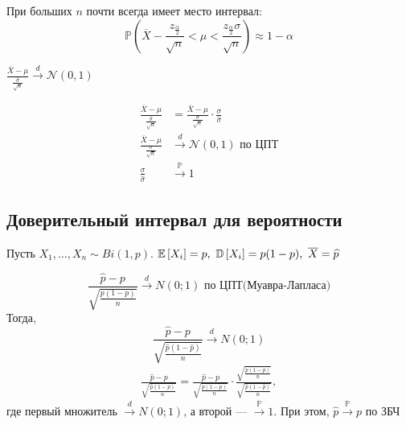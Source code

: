 \documentclass[a4paper, 10pt]{article}
\begin{document}
\comment При больших $n$ почти всегда имеет место интервал:
\begin{equation*}
    \mathbb{P}\left(\overline{X}-\frac{z_{\frac{\alpha}{2}}}{\sqrt{n}}<\mu<\frac{z_{\frac{\alpha}{2}} \sigma}{\sqrt{n}}\right)\approx1-\alpha
\end{equation*}

\theorem $\frac{\bar{X}-\mu}{\frac{\widehat{\sigma}}{\sqrt{n}}} \overset{d}{\longrightarrow} \mathcal{N}(0,1)$

\proof 
\begin{equation*}
    \begin{aligned}
        \frac{\bar{X}-\mu}{\frac{\widehat{\sigma}}{\sqrt{n}}}&=\frac{\bar{X}-\mu}{\frac{\sigma}{\sqrt{n}}}\cdot\frac{\sigma}{\widehat{\sigma}}\\
        \frac{\bar{X}-\mu}{\frac{\sigma}{\sqrt{n}}} &\overset{d}{\longrightarrow} \mathcal{N}(0,1)\text{ по ЦПТ}\\
        \frac{\sigma}{\widehat{\sigma}}&\overset{\mathbb{P}}{\longrightarrow}1
    \end{aligned}
\end{equation*}


\subsection{Доверительный интервал для вероятности}
Пусть $X_1,\ldots,X_n\sim Bi(1,p)$. $\matwait{X_i}=p,\ \dispersia{X_i}=p(1-p),\ \overline{X}=\widehat{p}$

\begin{equation*}
    \frac{\widehat{p}-p}{\sqrt{\frac{p(1-p)}{n}}}\overset{d}{\longrightarrow}N(0;1)\text{ по ЦПТ(Муавра-Лапласа)}
\end{equation*}
Тогда,
\begin{equation*}
    \frac{\widehat{p}-p}{\sqrt{\frac{\widehat{p}(1-\widehat{p})}{n}}}\overset{d}{\longrightarrow}N(0;1)
\end{equation*}
\begin{equation*}
    \begin{aligned}
        \frac{\widehat{p}-p}{\sqrt{\frac{\widehat{p}(1-\widehat{p})}{n}}}=\frac{\widehat{p}-p}{\sqrt{\frac{p(1-p)}{n}}}\cdot\frac{\sqrt{\frac{p(1-p)}{n}}}{\sqrt{\frac{\widehat{p}(1-\widehat{p})}{n}}},
    \end{aligned}
\end{equation*}
где первый множитель $\overset{d}{\longrightarrow}N(0;1)$, а второй — $\overset{\mathbb{P}}{\longrightarrow}1$. При этом, $\widehat{p}\overset{\mathbb{P}}{\longrightarrow}p$ по ЗБЧ
\end{document}
